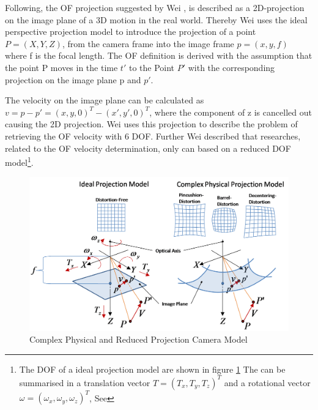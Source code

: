 Following, the \gls{OF} projection suggested by Wei , is described as a 2D-projection on the image plane
 of a 3D motion in the real world. Thereby Wei uses the ideal perspective
 projection model to introduce the projection of a
point \ensuremath{P=(X,Y,Z)}, from the camera frame into the image frame
\ensuremath{p=(x,y,f)} where f is the focal length. The \gls{OF} definition
is derived with the assumption that the point P moves in the time \ensuremath{t'}
to the Point \ensuremath{P'} with the corresponding projection on the image plane
p and \ensuremath{p'}.

The velocity on the image plane can be calculated as
\ensuremath{v=p-p'=(x, y, 0)^{T} - (x', y', 0)^{T}}, where the component of z is
cancelled out causing the 2D projection. Wei uses this projection to describe the problem
of retrieving the \gls{OF} velocity with 6 \gls{DOF}.
\newpage
Further Wei described that
researches, related to the \gls{OF} velocity determination, only can based on a reduced \gls{DOF}~
model\footnote{The \gls{DOF} of a ideal projection model are shown in figure
\ref{fig:ProjectionModels.png} The can be summarised in a translation vector
\ensuremath{T=(T_x, T_y, T_z)^{T}} and a rotational vector
\ensuremath{ \omega=(\omega_x, \omega_y, \omega_z)^{T}}, See
}.


\begin{figure}[H]
	\centering
		\includegraphics[width=1\textwidth]{graphic/ProjectionModels.png}
\caption{Complex Physical and Reduced Projection Camera Model}
	\label{fig:ProjectionModels.png}
\end{figure}

